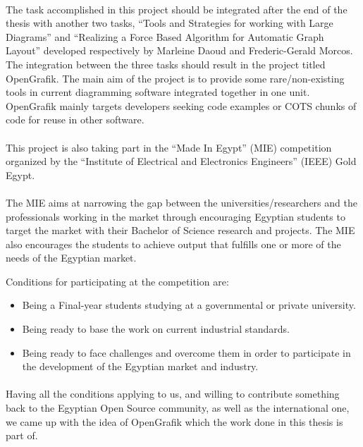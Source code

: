 \paragraph{}
The task accomplished in this project should be integrated after the end of the thesis with another two tasks, ``Tools and Strategies for working with Large Diagrams'' and ``Realizing a Force Based Algorithm for Automatic Graph Layout'' developed respectively by Marleine Daoud and Frederic-Gerald Morcos. The integration between the three tasks should result in the project titled OpenGrafik. The main aim of the project is to provide some rare/non-existing tools in current diagramming software integrated together in one unit. OpenGrafik mainly targets developers seeking code examples or COTS chunks of code for reuse in other software.

\paragraph{}
This project is also taking part in the ``Made In Egypt'' (MIE) competition organized by the ``Institute of Electrical and Electronics Engineers'' (IEEE) Gold Egypt.

\paragraph{}
The MIE aims at narrowing the gap between the universities/researchers and the professionals working in the market through encouraging Egyptian students to target the market with their Bachelor of Science research and projects. The MIE also encourages the students to achieve output that fulfills one or more of the needs of the Egyptian market.

Conditions for participating at the competition are:
\begin{itemize}
\item Being a Final-year students studying at a governmental or private university.
\item Being ready to base the work on current industrial standards.
\item Being ready to face challenges and overcome them in order to participate in the development of the Egyptian market and industry.
\end{itemize}

\paragraph{}
Having all the conditions applying to us, and willing to contribute something back to the Egyptian Open Source community, as well as the international one, we came up with the idea of OpenGrafik which the work done in this thesis is part of.

